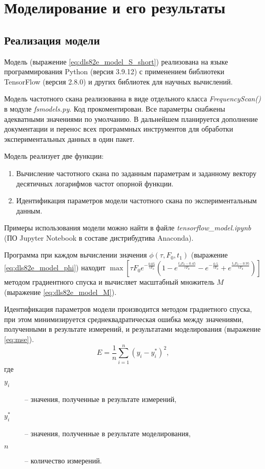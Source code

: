 \section{Моделирование и его результаты}
	

	\subsection{Реализация модели}
	Модель (выражение \ref{eq:dls82e_model_S_short}) реализована на 
	языке программирования Python (версия 3.9.12) с применением 
	библиотеки TensorFlow (версия 2.8.0) и других библиотек	для научных
	вычислений.

	Модель частотного скана реализованна в виде отдельного класса
	\emph{FrequencyScan()} в модуле \emph{fsmodels.py}. Код 
	прокоментирован. Все параметры снабжены адекватными значениями по 
	умолчанию. В дальнейшем планируется дополнение документации и 
	перенос всех программных инструментов для обработки 
	экспериментальных данных в один пакет.

	Модель реализует две функции:
	\begin{enumerate}
		\item Вычисление частотного скана по заданным параметрам и 
		заданному вектору десятичных логарифмов частот опорной функции.
		\item Идентификация параметров модели частотного скана по 
		экспериментальным данным.
	\end{enumerate}
	Примеры использования модели можно найти в файле 
	\emph{tensorflow\_model.ipynb} (ПО Jupyter Notebook в составе 
	дистрибудтива Anaconda).

	Программа при каждом вычислении значения $\phi\left(\tau,F_0,
	t_1\right)$	(выражение \ref{eq:dls82e_model_phi}) находит 
	\(
		\max{\left[
	    \tau F_0 e^{-\frac{0.05}{\tau F_0}}
	    \left(1-e^{\frac{t_1 F_0-0.45}{\tau F_0}}
	    -e^{-\frac{0.5}{\tau F_0}}+
	    e^{\frac{t_1 F_0-0.95}{\tau F_0}}\right)
	    \right]}
    \)
	методом	градиентного спуска и вычисляет масштабный множитель $M$ 
	(выражение \ref{eq:dls82e_model_M}).

	Идентификация параметров модели производится методом градиетного 
	спуска, при этом минимизируется среднеквадратическая ошибка между 
	значениями, полученными в результате измерений, и результатами 
	моделирования (выражение \ref{eq:mse}).
	\begin{equation}
		\label{eq:mse}
		E = \frac{1}{n}\sum_{i=1}^{n}\left(y_i - y_i^*\right)^2,
	\end{equation}
	где
	\begin{description}
		\item[$y_i$] -- значения, полученные в результате измерений,
		\item[$y_i^*$] -- значения, полученные в результате моделирования,
		\item[$n$] -- количество измерений.
	\end{description}

